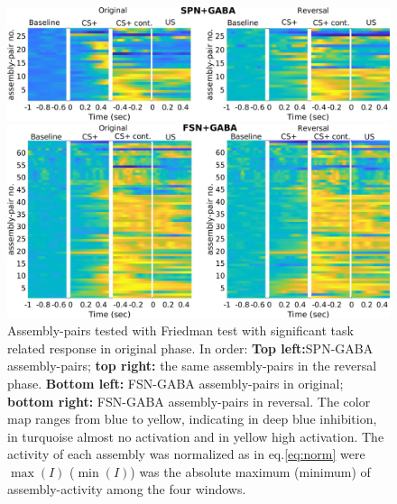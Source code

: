  \begin{figure}
     \centering
     \includegraphics[scale=0.32]{figures/HeatSPN_GABA.pdf}
     
     \vspace{1cm}
     
     \includegraphics[scale=0.32]{figures/HeatFSN_GABA.pdf}
     \caption{Assembly-pairs tested with Friedman test with significant task related response in original phase. In order: \textbf{Top left:}SPN-GABA assembly-pairs; \textbf{top right:} the same assembly-pairs in the reversal phase. \textbf{Bottom left:} FSN-GABA assembly-pairs in original; \textbf{bottom right:} FSN-GABA assembly-pairs in reversal. The color map ranges from blue to yellow, indicating in deep blue inhibition, in turquoise almost no activation and in yellow high activation. The activity of each assembly was normalized as in eq.\ref{eq:norm} were $\max(I)$ ($\min(I)$) was the absolute maximum (minimum) of assembly-activity among the four windows.}
     \label{fig:HeatPairsGaba}
 \end{figure}

